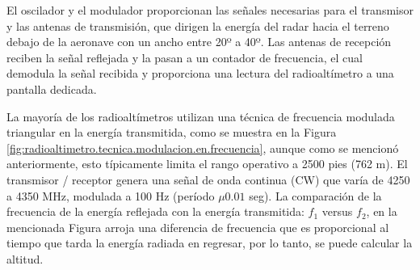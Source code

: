 El oscilador y el modulador proporcionan las señales necesarias para el transmisor y las antenas de transmisión, que dirigen la energía del radar hacia el terreno debajo de la aeronave con un ancho entre 20º a 40º. 
Las antenas de recepci\'on reciben la se\~nal reflejada y la pasan a un contador de frecuencia, el cual demodula la señal recibida y proporciona una lectura del radioalt\'imetro a una pantalla dedicada.


\begin{figure}[!htb]
  \centering
  \hspace{0.05\textwidth}
    
\end{figure}


La mayoría de los radioalt\'imetros utilizan una técnica de frecuencia modulada triangular en la energía transmitida, como se muestra en la Figura \ref{fig:radioaltimetro.tecnica.modulacion.en.frecuencia}, aunque como se mencionó anteriormente, esto típicamente limita el rango operativo a 2500 pies (762 m). El transmisor / receptor genera una señal de onda continua (CW) que varía de 4250 a 4350 MHz, modulada a 100 Hz (período $\mu 0.01$ seg). La comparación de la frecuencia de la energía reflejada con la energía transmitida: $f_1$ versus $f_2$, en la mencionada Figura  arroja una diferencia de frecuencia que es proporcional al tiempo que tarda la energía radiada en regresar, por lo tanto, se puede calcular la altitud.


